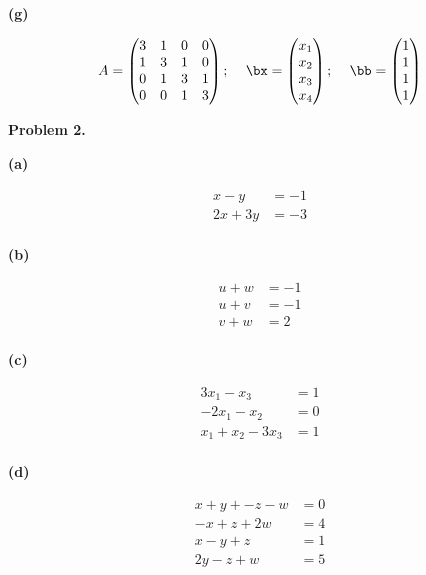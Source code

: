 \documentclass[oneside,12pt]{amsart}
\begin{document}
\textbf{(g)}

$$
\begin{matrix}
A=
\begin{pmatrix}
3 & 1  & 0 & 0\\
1 & 3 & 1 & 0 \\
0 & 1 & 3 & 1 \\
0 & 0 & 1 & 3 \\
\end{pmatrix}
\text{; }
&
\bx=
\begin{pmatrix}
x_1 \\ x_2 \\ x_3 \\ x_4
\end{pmatrix}
\text{;  }
&
\bb=
\begin{pmatrix}
1 \\1 \\ 1 \\ 1
\end{pmatrix}
\end{matrix}
$$

\textbf{Problem 2.}

\smallskip

\textbf{(a)}

\begin{align*}
 x  -y  &= -1 \\
2x + 3y  &= -3 \\
\end{align*}

\textbf{(b)}

\begin{align*}
 u + w   &= -1 \\
u + v   &= -1 \\
v  +w   &= 2 \\
\end{align*}

\textbf{(c)}

\begin{align*}
 3x_1 - x_3     &= 1 \\
-2x_1 - x_2      &= 0 \\
x_1  +x_2  -3x_3     &= 1 \\
\end{align*}

\textbf{(d)}

\begin{align*}
 x + y + -z -  w   &= 0 \\
-x   +  z + 2w   &= 4 \\
x - y  +z    &= 1 \\
2y -z  +w   &= 5 \\
\end{align*}
\end{document}
